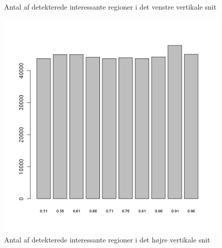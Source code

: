 {\begin{figure}[ht]
\begin{minipage}[b]{0.5\linewidth}
\begin{center}
		\caption{Antal af detekterede interessante regioner i det
		venstre vertikale snit}
		\label{cut1feats}
		\end{center}
	\end{minipage}
\end{figure}
\begin{figure}[ht]
	\begin{minipage}[b]{0.5\linewidth}
		\begin{center}
		\includegraphics[scale=0.4]{afsnit/resultater/billeder/cut2featsperratio.png}
		\caption{Antal af detekterede interessante regioner i det højre
		vertikale snit}
		\label{cut0feats}
		\end{center}
	\end{minipage}
	\hspace{0.5cm}
	\begin{minipage}[b]{0.5\linewidth}
		\begin{center}

\end{center}
\end{minipage}
\end{figure}}
